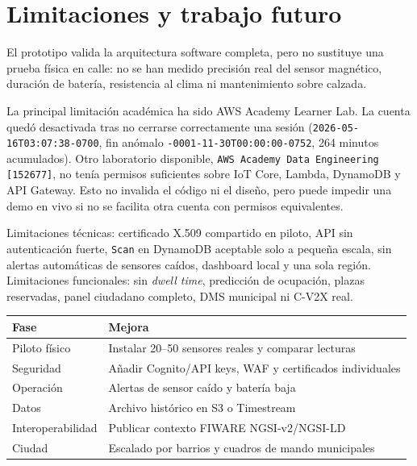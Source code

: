 \documentclass[11pt,a4paper]{article}
\begin{document}
\section{Limitaciones y trabajo futuro}

El prototipo valida la arquitectura software completa, pero no sustituye una prueba física en calle: no se han medido precisión real del sensor magnético, duración de batería, resistencia al clima ni mantenimiento sobre calzada.

La principal limitación académica ha sido AWS Academy Learner Lab. La cuenta quedó desactivada tras no cerrarse correctamente una sesión (\texttt{2026-05-16T03:07:38-0700}, fin anómalo \texttt{-0001-11-30T00:00:00-0752}, 264 minutos acumulados). Otro laboratorio disponible, \texttt{AWS Academy Data Engineering [152677]}, no tenía permisos suficientes sobre IoT Core, Lambda, DynamoDB y API Gateway. Esto no invalida el código ni el diseño, pero puede impedir una demo en vivo si no se facilita otra cuenta con permisos equivalentes.

Limitaciones técnicas: certificado X.509 compartido en piloto, API sin autenticación fuerte, \texttt{Scan} en DynamoDB aceptable solo a pequeña escala, sin alertas automáticas de sensores caídos, dashboard local y una sola región. Limitaciones funcionales: sin \emph{dwell time}, predicción de ocupación, plazas reservadas, panel ciudadano completo, DMS municipal ni C-V2X real.

\begin{longtable}{P{4cm}P{10.7cm}}
\toprule
\textbf{Fase} & \textbf{Mejora} \\
\midrule
\endhead
Piloto físico & Instalar 20--50 sensores reales y comparar lecturas \\
Seguridad & Añadir Cognito/API keys, WAF y certificados individuales \\
Operación & Alertas de sensor caído y batería baja \\
Datos & Archivo histórico en S3 o Timestream \\
Interoperabilidad & Publicar contexto FIWARE NGSI-v2/NGSI-LD \\
Ciudad & Escalado por barrios y cuadros de mando municipales \\
\bottomrule
\end{longtable}
\end{document}
